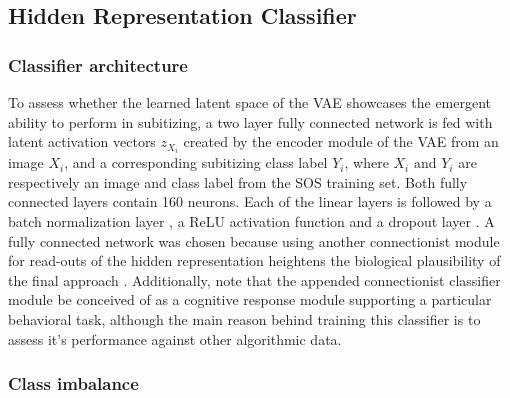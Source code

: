 \documentclass[twocolumn]{article}
\begin{document}
\hypertarget{readout}{%
\subsection{Hidden Representation Classifier}\label{readout}}

\hypertarget{classifierarch}{%
\subsubsection{Classifier architecture}\label{classifierarch}}

To assess whether the learned latent space of the VAE showcases the
emergent ability to perform in subitizing, a two layer fully connected
network is fed with latent activation vectors \(z_{X_i}\) created by the
encoder module of the VAE from an image \(X_i\), and a corresponding
subitizing class label \(Y_i\), where \(X_i\) and \(Y_i\) are
respectively an image and class label from the SOS training set. Both
fully connected layers contain 160 neurons. Each of the linear layers is
followed by a batch normalization layer \citep{ioffe2015batch}, a ReLU
activation function and a dropout layer \citep{srivastava2014dropout}. A fully connected
network was chosen because using another connectionist module for read-outs
of the hidden representation heightens the biological plausibility of
the final approach \citep{zorzi2013modeling}. Additionally,
\citet{zorzi2013modeling} note that the appended connectionist
classifier module be conceived of as a cognitive response module
supporting a particular behavioral task, although the main reason behind
training this classifier is to assess it's performance against other
algorithmic data.

\hypertarget{imbalance}{
\subsubsection{Class imbalance}\label{imbalance}}
\end{document}
